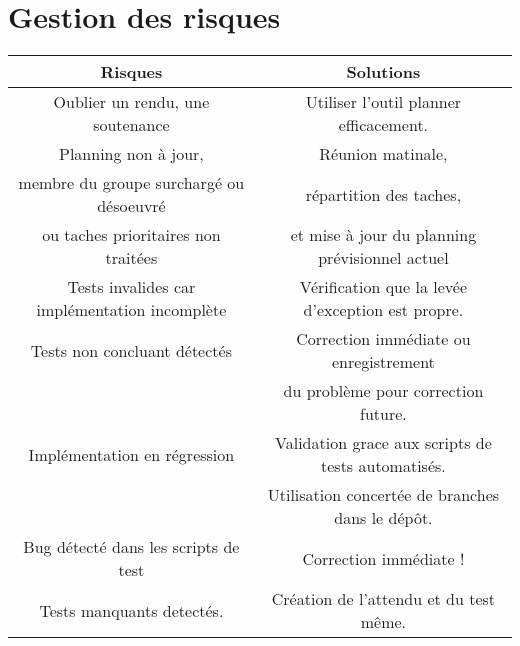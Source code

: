 \documentclass[11pt]{article}
\begin{document}
\section{Gestion des risques}
\begin{tabular}{|c|c|}
\hline
Risques & Solutions \\
\hline
\hline
Oublier un rendu, une soutenance & Utiliser l'outil planner efficacement. \\
\hline
Planning non à jour, & Réunion matinale, \\
membre du groupe surchargé ou désoeuvré & répartition des taches, \\
ou taches prioritaires non traitées & et mise à jour du planning prévisionnel actuel\\
\hline
Tests invalides car implémentation incomplète & Vérification que la levée d'exception est propre.\\
\hline
Tests non concluant détectés & Correction immédiate ou enregistrement\\
&du problème pour correction future.\\
\hline
Implémentation en régression & Validation grace aux scripts de tests automatisés.\\
&Utilisation concertée de branches dans le dépôt. \\
\hline
Bug détecté dans les scripts de test & Correction immédiate ! \\
\hline
Tests manquants detectés. & Création de l'attendu et du test même. \\
\hline
\end{tabular}
\end{document}
